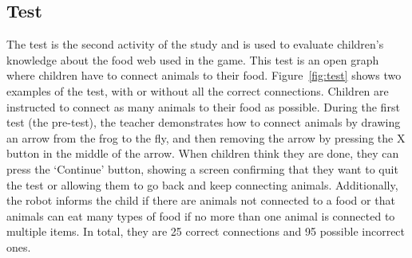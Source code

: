 \subsection{Test} \label{sec:tuto_test}
The test is the second activity of the study and is used to evaluate children's knowledge about the food web used in the game. This test is an open graph where children have to connect animals to their food. Figure~\ref{fig:test} shows two examples of the test, with or without all the correct connections. Children are instructed to connect as many animals to their food as possible. During the first test (the pre-test), the teacher demonstrates how to connect animals by drawing an arrow from the frog to the fly, and then removing the arrow by pressing the X button in the middle of the arrow. When children think they are done, they can press the `Continue' button, showing a screen confirming that they want to quit the test or allowing them to go back and keep connecting animals. Additionally, the robot informs the child if there are animals not connected to a food or that animals can eat many types of food if no more than one animal is connected to multiple items. In total, they are 25 correct connections and 95 possible incorrect ones.

